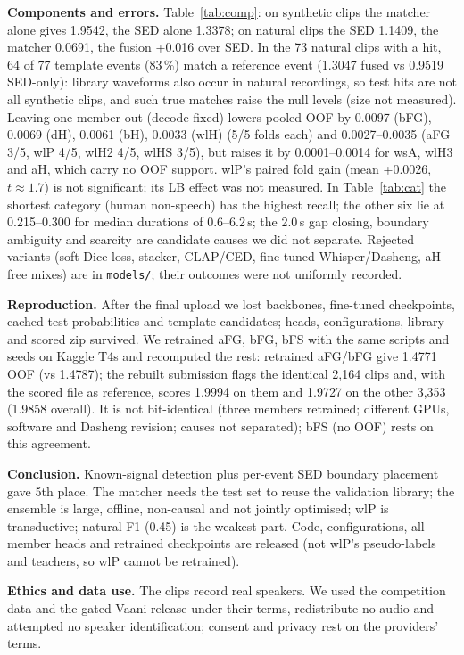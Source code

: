 \documentclass[conference]{IEEEtran}
\begin{document}
\textbf{Components and errors.} Table~\ref{tab:comp}: on synthetic clips the matcher alone gives 1.9542, the SED
alone 1.3378; on natural clips the SED 1.1409, the matcher 0.0691, the fusion +0.016 over SED. In the 73 natural
clips with a hit, 64 of 77 template events (83\,\%) match a reference event (1.3047 fused vs 0.9519 SED-only):
library waveforms also occur in natural recordings, so test hits are not all synthetic clips, and such true matches
raise the null levels (size not measured). Leaving one member out (decode fixed) lowers pooled OOF by 0.0097
(bFG), 0.0069 (dH), 0.0061 (bH), 0.0033 (wlH) (5/5 folds each) and 0.0027--0.0035 (aFG 3/5, wlP 4/5, wlH2 4/5,
wlHS 3/5), but raises it by 0.0001--0.0014 for wsA, wlH3 and aH, which carry no OOF support. wlP's paired fold
gain (mean +0.0026, $t\approx1.7$) is not significant; its LB effect was not measured. In Table~\ref{tab:cat} the
shortest category (human non-speech) has the highest recall; the other six lie at 0.215--0.300 for median
durations of 0.6--6.2\,s; the 2.0\,s gap closing, boundary ambiguity and scarcity are candidate causes we did not
separate. Rejected variants (soft-Dice loss, stacker, CLAP/CED, fine-tuned Whisper/Dasheng, aH-free mixes) are in
\texttt{models/}; their outcomes were not uniformly recorded.

\textbf{Reproduction.} After the final upload we lost backbones, fine-tuned checkpoints, cached test probabilities
and template candidates; heads, configurations, library and scored zip survived. We retrained aFG, bFG, bFS with
the same scripts and seeds on Kaggle T4s and recomputed the rest: retrained aFG/bFG give 1.4771 OOF (vs 1.4787);
the rebuilt submission flags the identical 2,164 clips and, with the scored file as reference, scores 1.9994 on
them and 1.9727 on the other 3,353 (1.9858 overall). It is not bit-identical (three members retrained; different
GPUs, software and Dasheng revision; causes not separated); bFS (no OOF) rests on this agreement.

\textbf{Conclusion.} Known-signal detection plus per-event SED boundary placement gave 5th place. The matcher needs
the test set to reuse the validation library; the ensemble is large, offline, non-causal and not jointly
optimised; wlP is transductive; natural F1 (0.45) is the weakest part. Code, configurations, all member heads and
retrained checkpoints are released (not wlP's pseudo-labels and teachers, so wlP cannot be retrained).

\textbf{Ethics and data use.} The clips record real speakers. We used the competition data and the gated Vaani
release under their terms, redistribute no audio and attempted no speaker identification; consent and privacy rest
on the providers' terms.
\end{document}
